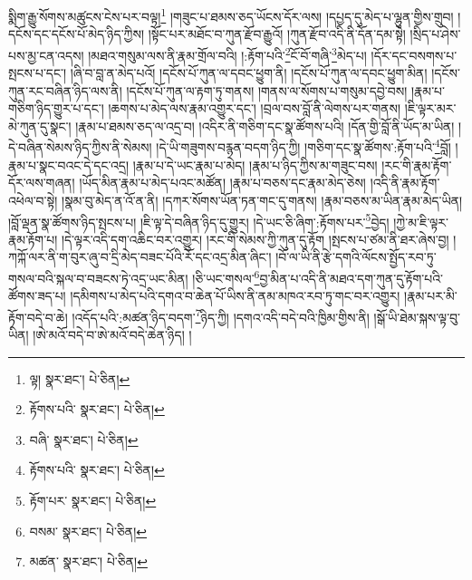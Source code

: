 སྨིག་རྒྱུ་སོགས་མཚུངས་ངེས་པར་བལྟ།\footnote{ལྟ།  སྣར་ཐང་།  པེ་ཅིན། } །གཟུང་པ་ཐམས་ཅད་ཡོངས་དོར་ལས། །དཔྱད་དུ་མེད་པ་ལྷུན་གྱིས་གྲུབ། །དངོས་དང་དངོས་པོ་མེད་ཉིད་ཀྱིས། །སྟོང་པར་མཐོང་བ་ཀུན་རྫོབ་རྒྱུའོ། །ཀུན་རྫོབ་འདི་ནི་དོན་དམ་སྟེ། །སྲིད་པ་ཤེས་པས་མྱ་ངན་འདས། །མཐའ་གསུམ་ལས་ནི་རྣམ་གྲོལ་བའི། །:རྟོག་པའི་\footnote{རྟོགས་པའི་  སྣར་ཐང་།  པེ་ཅིན། }ངོ་བོ་གཞི་\footnote{བཞི་  སྣར་ཐང་།  པེ་ཅིན། }མེད་པ། །དོར་དང་བསགས་པ་སྤངས་པ་དང་། །ཞི་བ་བླ་ན་མེད་པའོ། །དངོས་པོ་ཀུན་ལ་དབང་ཕྱུག་ནི། །དངོས་པོ་ཀུན་ལ་དབང་ཕྱུག་མིན། །དངོས་ཀུན་རང་བཞིན་ཉིད་ལས་ནི། །དངོས་པོ་ཀུན་ལ་རྟག་ཏུ་གནས། །གནས་ལ་སོགས་པ་གསུམ་དབྱེ་བས། །རྣམ་པ་གཅིག་ཉིད་གྱུར་པ་དང་། །ཆགས་པ་མེད་ལས་རྣམ་འགྱུར་དང་། །བྲལ་བས་བློ་ནི་ལེགས་པར་གནས། །ཇི་ལྟར་མར་མེ་ཀུན་དུ་སྣང་། །རྣམ་པ་ཐམས་ཅད་ལ་འདྲ་བ། །འདིར་ནི་གཅིག་དང་སྣ་ཚོགས་པའི། །དོན་གྱི་བློ་ནི་ཡོད་མ་ཡིན། །དེ་བཞིན་སེམས་ཉིད་ཀྱིས་ནི་སེམས། །དེ་ཡི་གཟུགས་བརྙན་བདག་ཉིད་ཀྱི། །གཅིག་དང་སྣ་ཚོགས་:རྟོག་པའི་\footnote{རྟོགས་པའི་  སྣར་ཐང་།  པེ་ཅིན། }བློ། །རྣམ་པ་སྣང་བའང་དེ་དང་འདྲ། །རྣམ་པ་དེ་ཡང་རྣམ་པ་མེད། །རྣམ་པ་ཉིད་ཀྱིས་མ་གཟུང་བས། །རང་གི་རྣམ་རྟོག་དོར་ལས་གཞན། །ཡོད་མིན་རྣམ་པ་མེད་པའང་མཚོན། །རྣམ་པ་བཅས་དང་རྣམ་མེད་ཅེས། །འདི་ནི་རྣམ་རྟོག་འཕེལ་བ་སྟེ། །སྣམ་བུ་མེད་ན་འོ་ན་ནི། །དཀར་སོགས་ཡོན་ཏན་གང་དུ་གནས། །རྣམ་བཅས་མ་ཡིན་རྣམ་མེད་ཡིན། །བློ་ལྡན་སྣ་ཚོགས་ཉིད་སྤངས་པ། །ཇི་ལྟ་དེ་བཞིན་ཉིད་དུ་གྱུར། །དེ་ཡང་ཅི་ཞིག་:རྟོགས་པར་\footnote{རྟོག་པར་  སྣར་ཐང་།  པེ་ཅིན། }བྱེད། །ཀྱེ་མ་ཇི་ལྟར་རྣམ་རྟོག་པ། །དེ་ལྟར་འདི་དག་འཆིང་བར་འགྱུར། །རང་གི་སེམས་ཀྱི་ཀུན་དུ་རྟོག །སྤངས་པ་ཙམ་ནི་ཐར་ཞེས་བྱ། །ཀཀྐོ་ལར་ནི་ག་བུར་ཞུ་བ་དྲི་མེད་བཟང་པོའི་རོ་དང་འདྲ་མིན་ཞིང་། །བོ་ལ་ཡི་ནི་རྩེ་དགའི་ལོངས་སྤྱོད་རབ་ཏུ་གསལ་བའི་སྐལ་བ་བཟངས་ཏེ་འདྲ་ཡང་མིན། །ཅི་ཡང་གསལ་\footnote{བསམ་  སྣར་ཐང་།  པེ་ཅིན། }བྱ་མིན་པ་འདི་ནི་མཐའ་དག་ཀུན་དུ་རྟོག་པའི་ཚོགས་ཟད་པ། །དམིགས་པ་མེད་པའི་དགའ་བ་ཆེན་པོ་ཡིས་ནི་ནམ་མཁའ་རབ་ཏུ་གང་བར་འགྱུར། །རྣམ་པར་མི་རྟོག་བདེ་བ་ཆེ། །འདོད་པའི་:མཚན་ཉིད་བདག་\footnote{མཚན་  སྣར་ཐང་།  པེ་ཅིན། }ཉིད་ཀྱི། །དགའ་འདི་བདེ་བའི་ཁྱིམ་གྱིས་ནི། །སྒོ་ཡི་ཐེམ་སྐས་ལྟ་བུ་ཡིན། །ཨེ་མའོ་བདེ་བ་ཨེ་མའོ་བདེ་ཆེན་ཉིད། །
